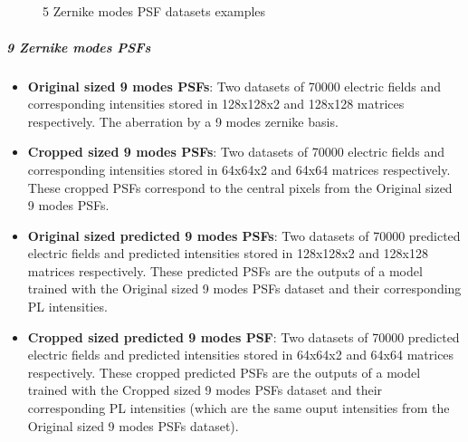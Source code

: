 			\begin{figure*}[ht!]
				\centering
				\\
					
				\\
					
				\\
					
				\\
			
			\caption{5 Zernike modes PSF datasets examples}
		\end{figure*}
			\FloatBarrier
			
			
			\subparagraph{9 Zernike modes PSFs}
			\begin{itemize}
				
				\item \textbf{Original sized 9 modes PSFs}: Two datasets of 70000 electric fields and corresponding intensities stored in 128x128x2 and 128x128 matrices respectively. The aberration by a 9 modes zernike basis.		
				\item \textbf{Cropped sized 9 modes PSFs}:  Two datasets of 70000 electric fields and corresponding intensities stored in 64x64x2 and 64x64 matrices respectively. These cropped  PSFs correspond to the central pixels from the Original sized 9 modes PSFs.
				\item \textbf{Original sized predicted 9 modes PSFs}:  Two datasets of 70000 predicted electric fields and predicted intensities stored in 128x128x2 and 128x128 matrices respectively. These predicted PSFs are the outputs of a model trained with the Original sized 9 modes PSFs dataset and their corresponding PL intensities.
				\item \textbf{Cropped sized predicted 9 modes PSF}: Two datasets of 70000 predicted electric fields and predicted intensities stored in 64x64x2 and 64x64 matrices respectively. These cropped predicted PSFs are the outputs of a model trained with the Cropped sized 9 modes PSFs dataset and their corresponding PL intensities (which are the same ouput intensities from the Original sized 9 modes PSFs dataset).
			\end{itemize}
			
